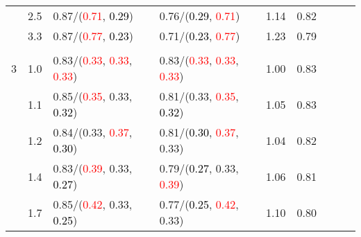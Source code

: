 \documentclass[10pt,a4paper]{report}
\begin{document}
\begin{table}[!htbp]
\begin{center}
{\begin{tabular}{ccllccccc}
				  & 2.5                               & 0.87/(\textcolor{red}{0.71}, \textcolor{black}{0.29})                                             & 0.76/(\textcolor{black}{0.29}, \textcolor{red}{0.71})                                             & 1.14             & 0.82                     \\
				  & 3.3                               & 0.87/(\textcolor{red}{0.77}, \textcolor{black}{0.23})                                             & 0.71/(\textcolor{black}{0.23}, \textcolor{red}{0.77})                                             & 1.23             & 0.79                     \\
				  &                                   &                                                                                                   &                                                                                                   &                                             \\
				3 & 1.0                               & 0.83/(\textcolor{red}{0.33}, \textcolor{red}{0.33}, \textcolor{red}{0.33})                        & 0.83/(\textcolor{red}{0.33}, \textcolor{red}{0.33}, \textcolor{red}{0.33})                        & 1.00             & 0.83                     \\
				  & 1.1                               & 0.85/(\textcolor{red}{0.35}, 0.33, \textcolor{black}{0.32})                                       & 0.81/(0.33, \textcolor{red}{0.35}, \textcolor{black}{0.32})                                       & 1.05             & 0.83                     \\
				  & 1.2                               & 0.84/(0.33, \textcolor{red}{0.37}, \textcolor{black}{0.30})                                       & 0.81/(\textcolor{black}{0.30}, \textcolor{red}{0.37}, 0.33)                                       & 1.04             & 0.82                     \\
				  & 1.4                               & 0.83/(\textcolor{red}{0.39}, 0.33, \textcolor{black}{0.27})                                       & 0.79/(\textcolor{black}{0.27}, 0.33, \textcolor{red}{0.39})                                       & 1.06             & 0.81                     \\
				  & 1.7                               & 0.85/(\textcolor{red}{0.42}, 0.33, \textcolor{black}{0.25})                                       & 0.77/(\textcolor{black}{0.25}, \textcolor{red}{0.42}, 0.33)                                       & 1.10             & 0.80                     \\

\end{tabular}}
\end{center}
\end{table}
\end{document}
